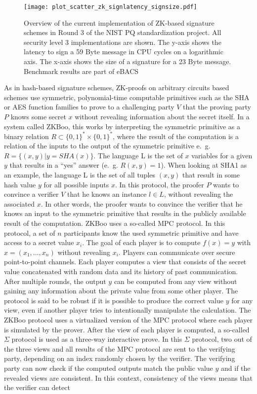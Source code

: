 \begin{figure}[!ht]
    \centering\texttt{[image: plot\_scatter\_zk\_signlatency\_signsize.pdf]}
    \caption{Overview of the current implementation of ZK-based signature schemes in Round 3 of the \acs{NIST} \acs{PQ} standardization project. All security level 3 implementations are shown. The y-axis shows the latency to sign a 59 Byte message in \acs{CPU} cycles on a logarithmic axis. The x-axis shows the size of a signature for a 23 Byte message. Benchmark results are part of eBACS\cite{eBACS}}\label{fig:zk_sign_scatter}
\end{figure}

As in hash-based signature schemes, ZK-proofs on arbitrary circuits based schemes use symmetric, polynomial-time computable primitives such as the SHA or AES function families to prove to a challenging party \(V\) that the proving party \(P\) knows some secret \(x\) without revealing information about the secret itself. In a system called ZKBoo, this works by interpreting the symmetric primitive as a binary relation \(R \subset \{0,1\}^* \times \{0,1\}^*\), where the result of the computation is a relation of the inputs to the output of the symmetric primitive e.~g. \( R = \{(x,y) \vert y = SHA(x)\}\). The language L is the set of \(x\) variables for a given \(y\) that results in a ``yes'' answer (e.~g. \(R(x,y) = 1\))\cite{giacomelli2016zkboo}. When looking at SHA1 as an example, the language L is the set of all tuples \((x,y)\) that result in some hash value \(y\) for all possible inputs \(x\). In this protocol, the proofer \(P\) wants to convince a verifier \(V\) that he knows an instance \(l \in L\), without revealing the associated \(x\). In other words, the proofer wants to convince the verifier that he knows an input to the symmetric primitive that results in the publicly available result of the computation. ZKBoo uses a so-called \ac{MPC} protocol. In this protocol, a set of \(n\) participants know the used symmetric primitive and have access to a secret value \(x_i\). The goal of each player is to compute \(f(x) = y\) with \(x = (x_1,\dots,x_n)\) without revealing \(x_i\). Players can communicate over secure point-to-point channels. Each player computes a view that consists of the secret value concatenated with random data and its history of past communication. After multiple rounds, the output \(y\) can be computed from any view without gaining any information about the private value from some other player. The protocol is said to be robust if it is possible to produce the correct value \(y\) for any view, even if another player tries to intentionally manipulate the calculation. The ZKBoo protocol uses a virtualized version of the \ac{MPC} protocol where each player is simulated by the prover. After the view of each player is computed, a so-called \(\Sigma\) protocol is used as a three-way interactive prove. In this \(\Sigma\) protocol, two out of the three views and all results of the \ac{MPC} protocol are sent to the verifying party, depending on an index randomly chosen by the verifier. The verifying party can now check if the computed outputs match the public value \(y\) and if the revealed views are consistent. In this context, consistency of the views means that the verifier can detect 